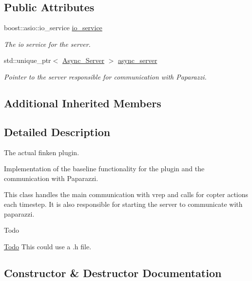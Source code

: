 \subsection*{Public Attributes}
\begin{DoxyCompactItemize}
\item 
boost\+::asio\+::io\+\_\+service \hyperlink{classFinkenPlugin_a895a0de924a1c60e3cb65ff1cf139fdc}{io\+\_\+service}
\begin{DoxyCompactList}\small\item\em The io service for the server. \end{DoxyCompactList}\item 
std\+::unique\+\_\+ptr$<$ \hyperlink{classAsync__Server}{Async\+\_\+\+Server} $>$ \hyperlink{classFinkenPlugin_aeb198541b548eb5b1ba09221aaa35a26}{async\+\_\+server}
\begin{DoxyCompactList}\small\item\em Pointer to the server responsible for communication with Paparazzi. \end{DoxyCompactList}\end{DoxyCompactItemize}
\subsection*{Additional Inherited Members}


\subsection{Detailed Description}
The actual finken plugin. 

Implementation of the baseline functionality for the plugin and the communication with Paparazzi.

This class handles the main communication with vrep and calls for copter actions each timestep. It is also responsible for starting the server to communicate with paparazzi.

\begin{DoxyRefDesc}{Todo}
\item[\hyperlink{todo__todo000005}{Todo}]This could use a .h file. \end{DoxyRefDesc}


\subsection{Constructor \& Destructor Documentation}

